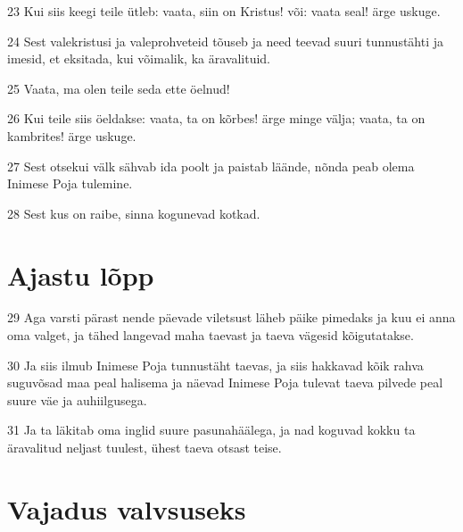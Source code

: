 \par 23 Kui siis keegi teile ütleb: vaata, siin on Kristus! või: vaata seal! ärge uskuge.
\par 24 Sest valekristusi ja valeprohveteid tõuseb ja need teevad suuri tunnustähti ja imesid, et eksitada, kui võimalik, ka äravalituid.
\par 25 Vaata, ma olen teile seda ette öelnud!
\par 26 Kui teile siis öeldakse: vaata, ta on kõrbes! ärge minge välja; vaata, ta on kambrites! ärge uskuge.
\par 27 Sest otsekui välk sähvab ida poolt ja paistab läände, nõnda peab olema Inimese Poja tulemine.
\par 28 Sest kus on raibe, sinna kogunevad kotkad.

\section*{Ajastu lõpp}

\par 29 Aga varsti pärast nende päevade viletsust läheb päike pimedaks ja kuu ei anna oma valget, ja tähed langevad maha taevast ja taeva vägesid kõigutatakse.
\par 30 Ja siis ilmub Inimese Poja tunnustäht taevas, ja siis hakkavad kõik rahva suguvõsad maa peal halisema ja näevad Inimese Poja tulevat taeva pilvede peal suure väe ja auhiilgusega.
\par 31 Ja ta läkitab oma inglid suure pasunahäälega, ja nad koguvad kokku ta äravalitud neljast tuulest, ühest taeva otsast teise.

\section*{Vajadus valvsuseks}

